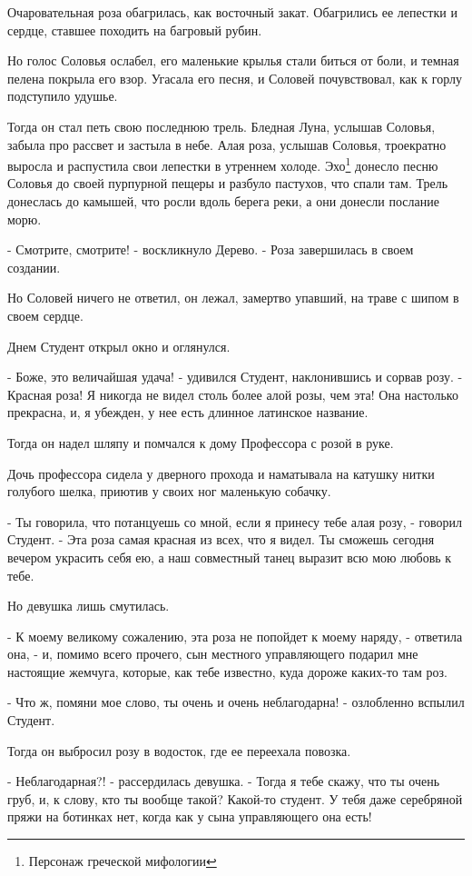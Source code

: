 \documentclass[a4paper]{article}
\theoremstyle{defin}
\theoremstyle{theorem}
\theoremstyle{prop}
\theoremstyle{lemma}
\theoremstyle{ex}
\theoremstyle{col}
\begin{document}
Очаровательная роза обагрилась, как восточный закат. Обагрились ее лепестки и сердце, ставшее походить на багровый рубин.

Но голос Соловья ослабел, его маленькие крылья стали биться от боли, и темная пелена покрыла его взор. Угасала его песня, и Соловей почувствовал, как к горлу подступило удушье.

Тогда он стал петь свою последнюю трель. Бледная Луна, услышав Соловья, забыла про рассвет и застыла в небе. Алая роза, услышав Соловья, троекратно выросла и распустила свои лепестки в утреннем холоде. Эхо\footnote{Персонаж греческой мифологии} донесло песню Соловья до своей пурпурной пещеры и разбуло пастухов, что спали там. Трель донеслась до камышей, что росли вдоль берега реки, а они донесли послание морю.

- Смотрите, смотрите! - воскликнуло Дерево. - Роза завершилась в своем создании.

Но Соловей ничего не ответил, он лежал, замертво упавший, на траве с шипом в своем сердце.

Днем Студент открыл окно и оглянулся.

- Боже, это величайшая удача! - удивился Студент, наклонившись и сорвав розу. - Красная роза! Я никогда не видел столь более алой розы, чем эта! Она настолько прекрасна, и, я убежден, у нее есть длинное латинское название.

Тогда он надел шляпу и помчался к дому Профессора с розой в руке.

Дочь профессора сидела у дверного прохода и наматывала на катушку нитки голубого шелка, приютив у своих ног маленькую собачку.

- Ты говорила, что потанцуешь со мной, если я принесу тебе алая розу, - говорил Студент. - Эта роза самая красная из всех, что я видел. Ты сможешь сегодня вечером украсить себя ею, а наш совместный танец выразит всю мою любовь к тебе.

Но девушка лишь смутилась.

- К моему великому сожалению, эта роза не попойдет к моему наряду, - ответила она, - и, помимо всего прочего, сын местного управляющего подарил мне настоящие жемчуга, которые, как тебе известно, куда дороже каких-то там роз.

- Что ж, помяни мое слово, ты очень и очень неблагодарна! - озлобленно вспылил Студент.

Тогда он выбросил розу в водосток, где ее переехала повозка.

- Неблагодарная?! - рассердилась девушка. - Тогда я тебе скажу, что ты очень груб, и, к слову, кто ты вообще такой? Какой-то студент. У тебя даже серебряной пряжи на ботинках нет, когда как у сына управляющего она есть!
\end{document}
